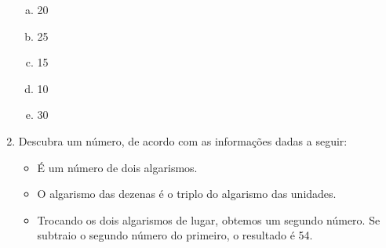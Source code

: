 \documentclass[a4paper,14pt]{article}
\begin{document}
\begin{multicols}{2}
\begin{enumerate}
        \begin{enumerate}[a)]
        	\item 20
        	\item 25
        	\item 15
        	\item 10
        	\item 30
        \end{enumerate}
        \item Descubra um número, de acordo com as informações dadas a seguir:
        \begin{itemize}
        	\item É um número de dois algarismos.
        	\item O algarismo das dezenas é o triplo do algarismo das unidades.
        	\item Trocando os dois algarismos de lugar, obtemos um segundo número. Se subtraio o segundo número do primeiro, o resultado é 54.
        \end{itemize}
    \end{enumerate}        
    \end{multicols}    
\end{document}
